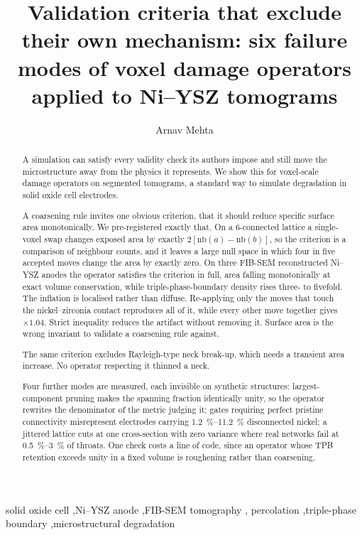 \documentclass[5p,times,twocolumn]{elsarticle}
\newcommand{\nb}{\mathrm{nb}}
\begin{document}
\begin{frontmatter}

\title{Validation criteria that exclude their own mechanism: six failure
modes of voxel damage operators applied to Ni--YSZ tomograms}


\author[a]{Arnav Mehta}
\address[a]{Department of Mechanical Engineering, University of Wisconsin--Madison, Madison, WI, USA}



\begin{abstract}
A simulation can satisfy every validity check its authors impose and still move
the microstructure away from the physics it represents. We show this for
voxel-scale damage operators on segmented tomograms, a standard way to simulate
degradation in solid oxide cell electrodes.

A coarsening rule invites one obvious criterion, that it should reduce
specific surface area monotonically. We pre-registered exactly that. On a 6-connected
lattice a single-voxel swap changes exposed area by exactly $2[\nb(a)-\nb(b)]$,
so the criterion is a comparison of neighbour counts, and it leaves a large
null space in which four in five accepted moves change the area by exactly
zero. On three FIB-SEM reconstructed Ni--YSZ anodes the operator satisfies
the criterion in full, area falling monotonically at exact volume conservation,
while triple-phase-boundary density rises three- to fivefold. The inflation is
localised rather than diffuse. Re-applying only the moves that touch the
nickel--zirconia contact reproduces all of it, while every other move together
gives $\times1.04$. Strict inequality
reduces the artifact without removing it. Surface area is the wrong invariant
to validate a coarsening rule against.

The same criterion excludes Rayleigh-type neck break-up, which needs a
transient area increase. No operator respecting it thinned a neck.

Four further modes are measured, each invisible on synthetic structures:
largest-component pruning makes the spanning fraction identically unity, so the
operator rewrites the denominator of the metric judging it; gates requiring
perfect pristine connectivity misrepresent electrodes carrying
\SIrange{1.2}{11.2}{\percent} disconnected nickel; a jittered lattice cuts at
one cross-section with zero variance where real networks fail at
\SIrange{0.5}{3}{\percent} of throats. One check costs a line of code, since an operator whose TPB retention exceeds
unity in a fixed volume is roughening rather than coarsening.
\end{abstract}

\begin{keyword}
solid oxide cell \sep Ni--YSZ anode \sep FIB-SEM tomography \sep
percolation \sep triple-phase boundary \sep microstructural degradation
\end{keyword}

\end{frontmatter}
\end{document}
